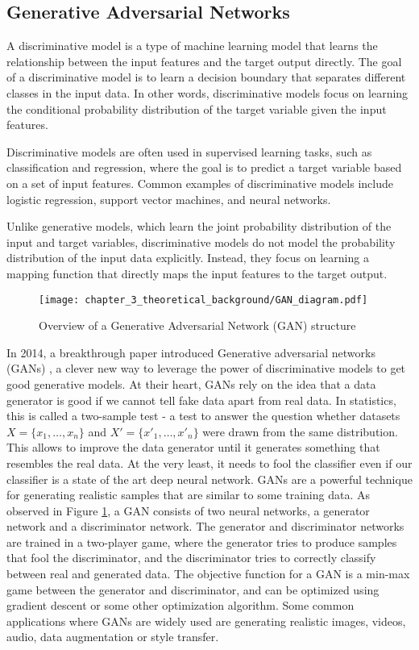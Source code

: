 \subsection{Generative Adversarial Networks}
\label{subsec:3_gans}

A discriminative model is a type of machine learning model that learns the relationship between the input features and the target output directly. The goal of a discriminative model is to learn a decision boundary that separates different classes in the input data. In other words, discriminative models focus on learning the conditional probability distribution of the target variable given the input features.

Discriminative models are often used in supervised learning tasks, such as classification and regression, where the goal is to predict a target variable based on a set of input features. Common examples of discriminative models include logistic regression, support vector machines, and neural networks.

Unlike generative models, which learn the joint probability distribution of the input and target variables, discriminative models do not model the probability distribution of the input data explicitly. Instead, they focus on learning a mapping function that directly maps the input features to the target output.

\begin{figure}[h]
	\centering
	\texttt{[image: chapter\_3\_theoretical\_background/GAN\_diagram.pdf]}
	\caption{Overview of a Generative Adversarial Network (GAN) structure}
	\label{fig:chapter_3_theoretical_background/GAN}
\end{figure}

In 2014, a breakthrough paper introduced Generative adversarial networks (GANs) \cite{goodfellow2020generative}, a clever new way to leverage the power of discriminative models to get good generative models. At their heart, GANs rely on the idea that a data generator is good if we cannot tell fake data apart from real data. In statistics, this is called a two-sample test - a test to answer the question whether datasets $X=\{x_1,\ldots, x_n\}$ and $X'=\{x'_1,\ldots, x'_n\}$ were drawn from the same distribution. This allows to improve the data generator until it generates something that resembles the real data. At the very least, it needs to fool the classifier even if our classifier is a state of the art deep neural network. GANs are a powerful technique for generating realistic samples that are similar to some training data. As observed in Figure \ref{fig:chapter_3_theoretical_background/GAN}, a GAN consists of two neural networks, a generator network and a discriminator network. The generator and discriminator networks are trained in a two-player game, where the generator tries to produce samples that fool the discriminator, and the discriminator tries to correctly classify between real and generated data. The objective function for a GAN is a min-max game between the generator and discriminator, and can be optimized using gradient descent or some other optimization algorithm. Some common applications where GANs are widely used are generating realistic images, videos, audio, data augmentation or style transfer.

